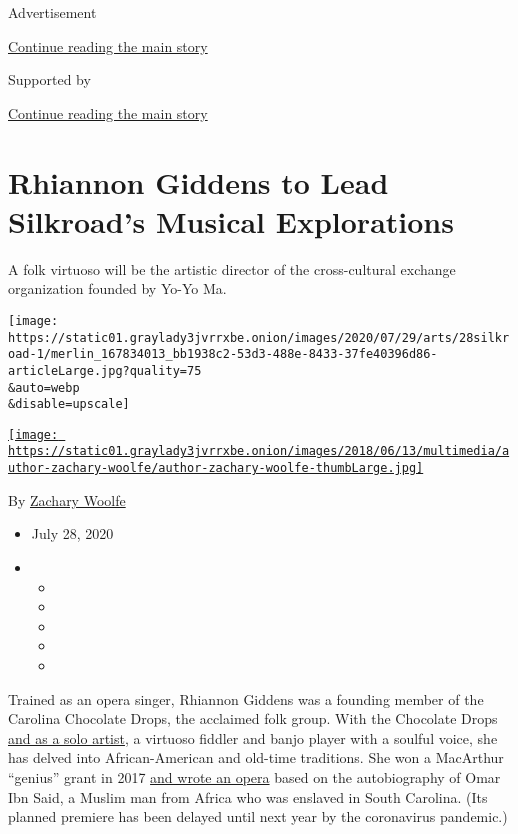 Advertisement

\protect\hyperlink{after-top}{Continue reading the main story}

Supported by

\protect\hyperlink{after-sponsor}{Continue reading the main story}

\hypertarget{rhiannon-giddens-to-lead-silkroads-musical-explorations}{%
\section{Rhiannon Giddens to Lead Silkroad's Musical
Explorations}\label{rhiannon-giddens-to-lead-silkroads-musical-explorations}}

A folk virtuoso will be the artistic director of the cross-cultural
exchange organization founded by Yo-Yo Ma.

\texttt{[image: https://static01.graylady3jvrrxbe.onion/images/2020/07/29/arts/28silkroad-1/merlin\_167834013\_bb1938c2-53d3-488e-8433-37fe40396d86-articleLarge.jpg?quality=75\\\&auto=webp\\\&disable=upscale]}

\href{https://www.nytimes3xbfgragh.onion/by/zachary-woolfe}{\texttt{[image: https://static01.graylady3jvrrxbe.onion/images/2018/06/13/multimedia/author-zachary-woolfe/author-zachary-woolfe-thumbLarge.jpg]}}

By \href{https://www.nytimes3xbfgragh.onion/by/zachary-woolfe}{Zachary
Woolfe}

\begin{itemize}
\item
  July 28, 2020
\item
  \begin{itemize}
  \item
  \item
  \item
  \item
  \item
  \end{itemize}
\end{itemize}

Trained as an opera singer, Rhiannon Giddens was a founding member of
the Carolina Chocolate Drops, the acclaimed folk group. With the
Chocolate Drops
\href{https://www.nytimes3xbfgragh.onion/2015/01/25/arts/music/a-solo-spotlight-for-a-powerful-voice.html}{and
as a solo artist}, a virtuoso fiddler and banjo player with a soulful
voice, she has delved into African-American and old-time traditions. She
won a MacArthur ``genius'' grant in 2017
\href{https://www.nytimes3xbfgragh.onion/2019/06/10/arts/music/rhiannon-giddens-opera.html}{and
wrote an opera} based on the autobiography of Omar Ibn Said, a Muslim
man from Africa who was enslaved in South Carolina. (Its planned
premiere has been delayed until next year by the coronavirus pandemic.)

